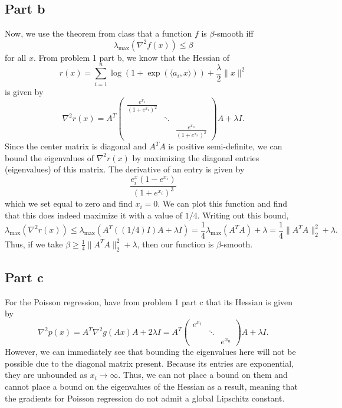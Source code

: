 \documentclass{article}
\begin{document}
\subsection{Part b}
Now, we use the theorem from class that a function $f$ is $\beta$-smooth iff 
\[
\lambda_{\text{max}}(\nabla^2f(x))\leq\beta
\]
for all $x$. From problem 1 part b, we know that the Hessian of 
\[
r(x)=\sum_{i=1}^n \log(1+\exp(\langle a_i, x\rangle)) + \frac{\lambda}{2}\|x\|^2
\]
is given by 
\[
\nabla^2 r(x)=A^T\begin{pmatrix}
\frac{e^{x_1}}{(1+e^{x_1})^2}\\
& \ddots\\
&& \frac{e^{x_n}}{(1+e^{x_n})^2}
\end{pmatrix}A+\lambda I.
\]
Since the center matrix is diagonal and $A^TA$ is positive semi-definite, we can bound the eigenvalues of $\nabla^2 r(x)$ by maximizing the diagonal entries (eigenvalues) of this matrix. The derivative of an entry is given by 
\[
\frac{e^x_i(1-e^{x_i})}{(1+e^{x_i})^3} 
\]
which we set equal to zero and find $x_i=0$. We can plot this function and find that this does indeed maximize it with a value of $1/4$. Writing out this bound,
\[
\lambda_{\text{max}}(\nabla^2r(x))\leq\lambda_{\text{max}}(A^T((1/4)I)A+\lambda I)=\frac{1}{4}\lambda_{\text{max}}(A^TA)+\lambda=\frac{1}{4}\|A^TA\|_2^2+\lambda.
\]
Thus, if we take $\beta\geq\frac{1}{4}\|A^TA\|_2^2+\lambda$, then our function is $\beta$-smooth.

\subsection{Part c}
For the Poisson regression, have from problem 1 part c that its Hessian is given by 
\[
\nabla^2 p(x)=A^T\nabla^2g(Ax)A+2\lambda I=A^T\begin{pmatrix}
e^{x_1}\\
& \ddots\\
&& e^{x_n}
\end{pmatrix}A+\lambda I.
\]
However, we can immediately see that bounding the eigenvalues here will not be possible due to the diagonal matrix present. Because its entries are exponential, they are unbounded as $x_i\to\infty$. Thus, we can not place a bound on them and cannot place a bound on the eigenvalues of the Hessian as a result, meaning that the gradients for Poisson regression do not admit a global Lipschitz constant.
\end{document}
